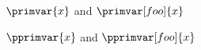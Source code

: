 \documentclass[minimal]{omdoc}
\begin{document}
$\primvar{x}$ and $\primvar[foo]{x}$

$\pprimvar{x}$ and $\pprimvar[foo]{x}$
\end{document}
